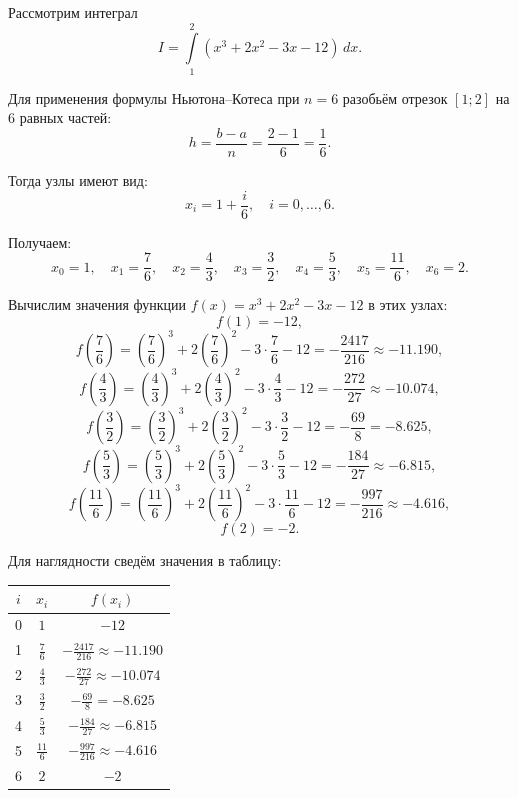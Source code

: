\documentclass[12pt]{report}
\begin{document}
	\begin{flushleft}
		Рассмотрим интеграл
		\[
		I=\int\limits_{1}^{2} (x^3+2x^2-3x-12)\,dx.
		\]
		
		Для применения формулы Ньютона--Котеса при $n=6$ разобьём отрезок $[1;2]$ на 6 равных частей:
		\[
		h=\frac{b-a}{n}=\frac{2-1}{6}=\frac{1}{6}.
		\]
		
		Тогда узлы имеют вид:
		\[
		x_i=1+\frac{i}{6}, \quad i=0,\dots,6.
		\]
		
		Получаем:
		\[
		x_0=1,\quad x_1=\frac{7}{6},\quad x_2=\frac{4}{3},\quad x_3=\frac{3}{2},\quad
		x_4=\frac{5}{3},\quad x_5=\frac{11}{6},\quad x_6=2.
		\]
		
		Вычислим значения функции $f(x)=x^3+2x^2-3x-12$ в этих узлах:
		\[
		f(1)=-12,
		\]
		\[
		f\left(\frac{7}{6}\right)=\left(\frac{7}{6}\right)^3+2\left(\frac{7}{6}\right)^2-3\cdot\frac{7}{6}-12
		=-\frac{2417}{216}\approx -11.190,
		\]
		\[
		f\left(\frac{4}{3}\right)=\left(\frac{4}{3}\right)^3+2\left(\frac{4}{3}\right)^2-3\cdot\frac{4}{3}-12
		=-\frac{272}{27}\approx -10.074,
		\]
		\[
		f\left(\frac{3}{2}\right)=\left(\frac{3}{2}\right)^3+2\left(\frac{3}{2}\right)^2-3\cdot\frac{3}{2}-12
		=-\frac{69}{8}=-8.625,
		\]
		\[
		f\left(\frac{5}{3}\right)=\left(\frac{5}{3}\right)^3+2\left(\frac{5}{3}\right)^2-3\cdot\frac{5}{3}-12
		=-\frac{184}{27}\approx -6.815,
		\]
		\[
		f\left(\frac{11}{6}\right)=\left(\frac{11}{6}\right)^3+2\left(\frac{11}{6}\right)^2-3\cdot\frac{11}{6}-12
		=-\frac{997}{216}\approx -4.616,
		\]
		\[
		f(2)=-2.
		\]
		
		Для наглядности сведём значения в таблицу:
		
		\begin{center}
			\begin{tabular}{|c|c|c|}
				\hline
				$i$ & $x_i$ & $f(x_i)$ \\
				\hline
				0 & $1$ & $-12$ \\
				\hline
				1 & $\frac{7}{6}$ & $-\frac{2417}{216}\approx -11.190$ \\
				\hline
				2 & $\frac{4}{3}$ & $-\frac{272}{27}\approx -10.074$ \\
				\hline
				3 & $\frac{3}{2}$ & $-\frac{69}{8}=-8.625$ \\
				\hline
				4 & $\frac{5}{3}$ & $-\frac{184}{27}\approx -6.815$ \\
				\hline
				5 & $\frac{11}{6}$ & $-\frac{997}{216}\approx -4.616$ \\
				\hline
				6 & $2$ & $-2$ \\
				\hline
			\end{tabular}
		\end{center}
		

\end{flushleft}
\end{document}
